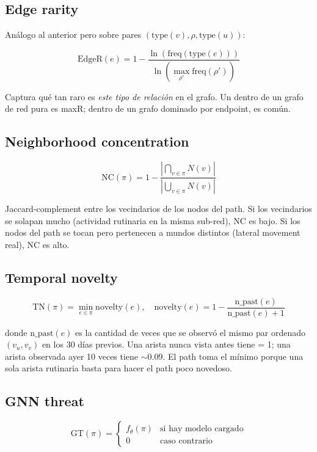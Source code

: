 \subsection{Edge rarity}

Análogo al anterior pero sobre pares $(\text{type}(v), \rho, \text{type}(u))$:

\[
\text{EdgeR}(e) = 1 - \frac{\ln(\text{freq}(\text{type}(e)))}{\ln(\max_{\rho'} \text{freq}(\rho'))}
\]

Captura qué tan raro es \emph{este tipo de relación} en el grafo.
Un  dentro de un grafo de red pura es
maxR; dentro de un grafo dominado por endpoint, es común.

\subsection{Neighborhood concentration}

\[
\text{NC}(\pi) = 1 - \frac{|\bigcap_{v \in \pi} N(v)|}{|\bigcup_{v \in \pi} N(v)|}
\]

Jaccard-complement entre los vecindarios de los nodos del path. Si
los vecindarios se solapan mucho (actividad rutinaria en la misma
sub-red), NC es bajo. Si los nodos del path se tocan pero
pertenecen a mundos distintos (lateral movement real), NC es alto.

\subsection{Temporal novelty}

\[
\text{TN}(\pi) = \min_{e \in \pi} \text{novelty}(e), \quad
\text{novelty}(e) = 1 - \frac{\text{n\_past}(e)}{\text{n\_past}(e) + 1}
\]

donde $\text{n\_past}(e)$ es la cantidad de veces que se observó
el mismo par ordenado $(v_u, v_v)$ en los 30 días previos. Una
arista nunca vista antes tiene  = 1; una arista
observada ayer 10 veces tiene $\sim 0.09$. El path toma el mínimo
porque una sola arista rutinaria basta para hacer el path poco
novedoso.

\subsection{GNN threat}

\[
\text{GT}(\pi) = \begin{cases} f_\theta(\pi) & \text{si hay modelo cargado}\\ 0 & \text{caso contrario} \end{cases}
\]

